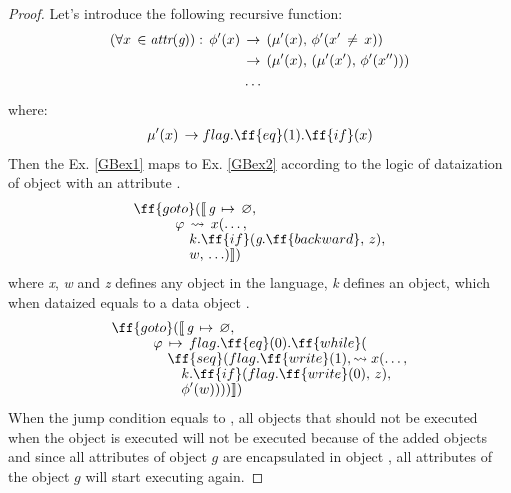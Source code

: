 \documentclass[sigplan,review,11pt,nonacm,natbib=false]{acmart}
\theoremstyle{theorems}
\newcommand\br{\\[-4pt]}
\begin{document}
    \begin{proof}
        Let's introduce the following recursive function:
        \begin{equation}
            \begin{split}
            (\forall x\,\in \emph{attr}(\emph{g})):\,\phi'(x)\,&\rightarrow\,(\mu'(x),\,\phi'(x'\,\neq\,x)) \\
            &\rightarrow\,(\mu'(x),\,(\mu'(x'),\,\phi'(x''))) \\
            &\ldots
            \end{split}
        \end{equation}
        where:
        \begin{equation}
            \begin{split}
                & \mu'(x)\,\rightarrow flag.\ff{eq}(1).\ff{if}(x) \\
            \end{split}
        \end{equation}
        Then the Ex. \ref{GBex1} maps to Ex. \ref{GBex2} according to the logic of dataization of  object with an attribute .
        \begin{equation}\label{GBex1}
        \begin{split}
            & \ff{goto}(\llbracket\,\emph{g}\,\mapsto\,\varnothing,\br
            & \quad \quad \quad \varphi\,\leadsto\,x(\ldots,\br
            & \quad \quad \quad \quad k.\ff{if}(\emph{g}.\ff{backward},\,z),\br
            & \quad \quad \quad \quad w,\,\ldots)\rrbracket) \\
        \end{split}
        \end{equation}
        where \emph{x}, \emph{w} and \emph{z} defines any object in the language, \emph{k} defines an object, which when dataized equals to a data object .
        \begin{equation}\label{GBex2}
        \begin{split}
            & \ff{goto}(\llbracket\,\emph{g}\,\mapsto\,\varnothing,\br
            & \quad \quad \quad \varphi\,\mapsto\,flag.\ff{eq}(0).\ff{while}(\br
            & \quad \quad \quad \quad \ff{seq}(flag.\ff{write}(1), \leadsto x(\ldots,\br
            & \quad \quad \quad \quad \quad k.\ff{if}(flag.\ff{write}(0),\,z),\br
            & \quad \quad \quad \quad \quad \phi'(w))))\rrbracket) \\
        \end{split}
        \end{equation}
        When the jump condition equals to , all objects that should not be executed when the  object is executed will not be executed because of the added  objects and since all attributes of object $g$ are encapsulated in object , all attributes of the object $g$ will start executing again.
    \end{proof}
\end{document}
